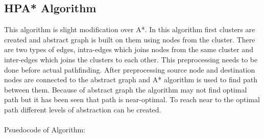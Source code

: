 \documentclass[a4paper, 12pt]{article}
\begin{document}
\newpage
\subsection{HPA* Algorithm}
\par
\hspace{1cm}
This algorithm is slight modification over A*.  In this algorithm first clusters are created and abstract graph is built on them using nodes from the cluster. There are two types of edges, intra-edges which joins nodes from the same cluster and inter-edges which joins the clusters to each other. This preprocessing needs to be done before actual pathfinding. After preprocessing source node and destination nodes are connected to the abstract graph and A* algorithm is used to find path between them. Because of abstract graph the algorithm may not  find optimal path but it has been seen that path is near-optimal. To reach near to the optimal path different levels of abstraction can be created.
\\
\\
Psuedocode of Algorithm:
\end{document}
